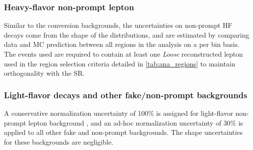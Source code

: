 \documentclass[../thesis.tex]{subfiles}
\begin{document}
\subsubsection*{Heavy-flavor non-prompt lepton}
Similar to the conversion backgrounds, the uncertainties on non-prompt \acs{HF} decays come from the shape of the distributions, and are estimated by comparing data and \acs{MC} prediction between all regions in the analysis on a per bin basis. The events used are required to contain at least one \textit{Loose} reconstructed lepton used in the region selection criteria detailed in \autoref{tab:ana_regions} to maintain orthogonality with the \acs{SR}.

\subsubsection*{Light-flavor decays and other fake/non-prompt backgrounds}
A conservative normalization uncertainty of 100\% is assigned for light-flavor non-prompt lepton background \citep{bg:ttH_ttW_ML}, and an ad-hoc normalization uncertainty of 30\% is applied to all other fake and non-prompt backgrounds. The shape uncertainties for these backgrounds are negligible.




\end{document}
